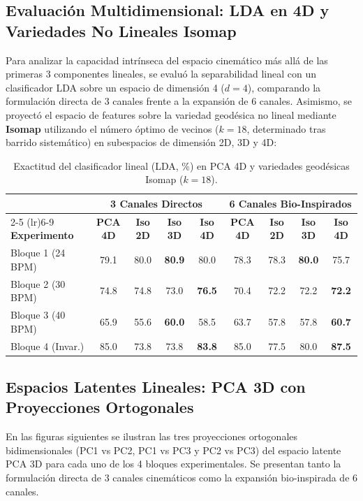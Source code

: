 \documentclass[11pt,a4paper]{report}
\begin{document}
\subsection{Evaluación Multidimensional: LDA en 4D y Variedades No Lineales Isomap}
Para analizar la capacidad intrínseca del espacio cinemático más allá de las primeras 3 componentes lineales, se evaluó la separabilidad lineal con un clasificador LDA sobre un espacio de dimensión 4 ($d=4$), comparando la formulación directa de 3 canales frente a la expansión de 6 canales. Asimismo, se proyectó el espacio de features sobre la variedad geodésica no lineal mediante \textbf{Isomap} utilizando el número óptimo de vecinos ($k=18$, determinado tras barrido sistemático) en subespacios de dimensión 2D, 3D y 4D:

\begin{table}[htbp]
    \centering
    \small
    \caption{Exactitud del clasificador lineal (LDA, \%) en PCA 4D y variedades geodésicas Isomap ($k=18$).}
    \label{tab:metricas_isomap_4d}
    \begin{tabular}{lcccccccc}
        \toprule
        & \multicolumn{4}{c}{\textbf{3 Canales Directos}} & \multicolumn{4}{c}{\textbf{6 Canales Bio-Inspirados}} \\
        \cmidrule(lr){2-5} \cmidrule(lr){6-9}
        \textbf{Experimento} & \textbf{PCA 4D} & \textbf{Iso 2D} & \textbf{Iso 3D} & \textbf{Iso 4D} & \textbf{PCA 4D} & \textbf{Iso 2D} & \textbf{Iso 3D} & \textbf{Iso 4D} \\
        \midrule
        Bloque 1 (24 BPM) & 79.1 & 80.0 & \textbf{80.9} & 80.0 & 78.3 & 78.3 & \textbf{80.0} & 75.7 \\
        Bloque 2 (30 BPM) & 74.8 & 74.8 & 73.0 & \textbf{76.5} & 70.4 & 72.2 & 72.2 & \textbf{72.2} \\
        Bloque 3 (40 BPM) & 65.9 & 55.6 & \textbf{60.0} & 58.5 & 63.7 & 57.8 & 57.8 & \textbf{60.7} \\
        Bloque 4 (Invar.) & 85.0 & 73.8 & 73.8 & \textbf{83.8} & 85.0 & 77.5 & 80.0 & \textbf{87.5} \\
        \bottomrule
    \end{tabular}
\end{table}

\subsection{Espacios Latentes Lineales: PCA 3D con Proyecciones Ortogonales}
En las figuras siguientes se ilustran las tres proyecciones ortogonales bidimensionales (PC1 vs PC2, PC1 vs PC3 y PC2 vs PC3) del espacio latente PCA 3D para cada uno de los 4 bloques experimentales. Se presentan tanto la formulación directa de 3 canales cinemáticos como la expansión bio-inspirada de 6 canales.
\end{document}
